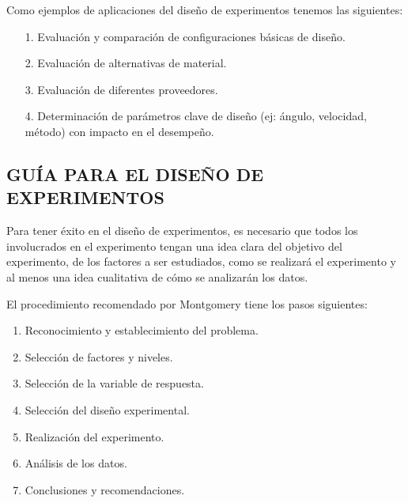 Como ejemplos de aplicaciones del dise\~no de experimentos tenemos las siguientes: 
\begin{itemize}
 \item[1.] Evaluaci\'on y comparaci\'on de configuraciones b\'asicas de dise\~no.
 \item[2.] Evaluaci\'on de alternativas de material.
 \item[3.] Evaluaci\'on de diferentes proveedores.
 \item[4.] Determinaci\'on de par\'ametros clave de dise\~no (ej: \'angulo, velocidad, m\'etodo) con impacto en el desempe\~no.
\end{itemize}

\subsection{GU\'IA PARA EL DISE\~NO DE EXPERIMENTOS} 

Para tener \'exito en el dise\~no de experimentos, es necesario que todos los involucrados en el experimento tengan una idea clara del objetivo del experimento, de los factores a ser estudiados, como se realizar\'a el experimento y al menos una idea cualitativa de c\'omo se analizar\'an los datos.

El procedimiento recomendado por Montgomery tiene los pasos siguientes:
\begin{enumerate}
 \item Reconocimiento y establecimiento del problema.
 \item Selecci\'on de factores y niveles.
 \item Selecci\'on de la variable de respuesta.
 \item Selecci\'on del dise\~no experimental.
 \item Realizaci\'on del experimento.
 \item An\'alisis de los datos.
 \item Conclusiones y recomendaciones.
\end{enumerate}



